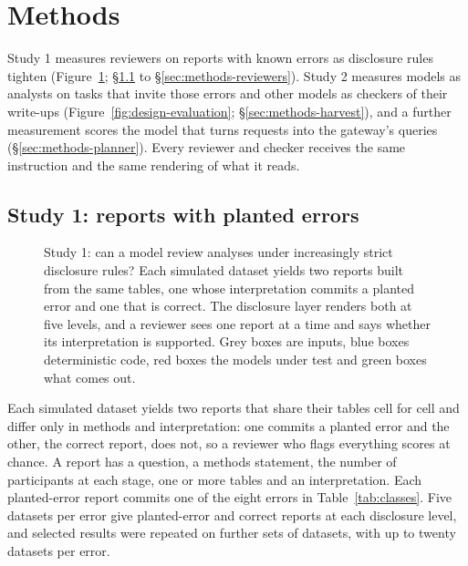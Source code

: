 \section{Methods}
\label{sec:methods}

Study 1 measures reviewers on reports with known errors as disclosure rules tighten (Figure~\ref{fig:design-review}; \S\ref{sec:methods-corpus} to \S\ref{sec:methods-reviewers}). Study 2 measures models as analysts on tasks that invite those errors and other models as checkers of their write-ups (Figure~\ref{fig:design-evaluation}; \S\ref{sec:methods-harvest}), and a further measurement scores the model that turns requests into the gateway's queries (\S\ref{sec:methods-planner}). Every reviewer and checker receives the same instruction and the same rendering of what it reads.

\subsection{Study 1: reports with planted errors}
\label{sec:methods-corpus}

\begin{figure}[t]
\centering

\caption{Study 1: can a model review analyses under increasingly strict disclosure rules? Each simulated dataset yields two reports built from the same tables, one whose interpretation commits a planted error and one that is correct. The disclosure layer renders both at five levels, and a reviewer sees one report at a time and says whether its interpretation is supported. Grey boxes are inputs, blue boxes deterministic code, red boxes the models under test and green boxes what comes out.}
\label{fig:design-review}
\end{figure}

Each simulated dataset yields two reports that share their tables cell for cell and differ only in methods and interpretation: one commits a planted error and the other, the correct report, does not, so a reviewer who flags everything scores at chance. A report has a question, a methods statement, the number of participants at each stage, one or more tables and an interpretation. Each planted-error report commits one of the eight errors in Table~\ref{tab:classes}. Five datasets per error give  planted-error and  correct reports at each disclosure level, and selected results were repeated on further sets of datasets, with up to twenty datasets per error.

